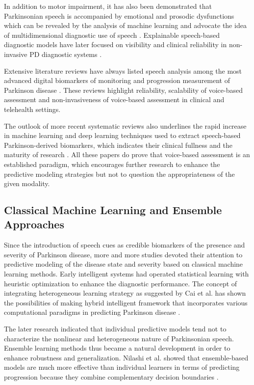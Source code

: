\documentclass{customIEEEsingle}
\begin{document}
	In addition to motor impairment, it has also been demonstrated that Parkinsonian speech is accompanied by emotional and prosodic dysfunctions which can be revealed by the analysis of machine learning and advocate the idea of multidimensional diagnostic use of speech \cite{sechidis-2021}. Explainable speech-based diagnostic models have later focused on visibility and clinical reliability in non-invasive PD diagnostic systems \cite{xu-2025}.
	
	Extensive literature reviews have always listed speech analysis among the most advanced digital biomarkers of monitoring and progression measurement of Parkinson disease \cite{jasim-2025,hossain-2025}. These reviews highlight reliability, scalability of voice-based assessment and non-invasiveness of voice-based assessment in clinical and telehealth settings.
	
	The outlook of more recent systematic reviews also underlines the rapid increase in machine learning and deep learning techniques used to extract speech-based Parkinson-derived biomarkers, which indicates their clinical fullness and the maturity of research  \cite{shokrpour-2025,rabie-2025}. All these papers do prove that voice-based assessment is an established paradigm, which encourages further research to enhance the predictive modeling strategies but not to question the appropriateness of the given modality.
	
	\subsection{Classical Machine Learning and Ensemble Approaches}
	
	Since the introduction of speech cues as credible biomarkers of the presence and severity of Parkinson disease, more and more studies devoted their attention to predictive modeling of the disease state and severity based on classical machine learning methods. Early intelligent systems had operated statistical learning with heuristic optimization to enhance the diagnostic performance. The concept of integrating heterogeneous learning strategy as suggested by Cai et al. has shown the possibilities of making hybrid intelligent framework that incorporates various computational paradigms in predicting Parkinson disease \cite{cai-2017}.
	
	The later research indicated that individual predictive models tend not to characterize the nonlinear and heterogeneous nature of Parkinsonian speech. Ensemble learning methods thus became a natural development in order to enhance robustness and generalization. Nilashi et al. showed that ensemble-based models are much more effective than individual learners in terms of predicting progression because they combine complementary decision boundaries \cite{nilashi-2016,nilashi-2022}.
	
\end{document}
